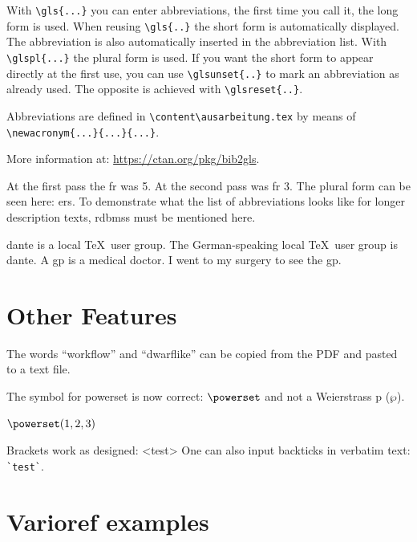 With \verb+\gls{...}+ you can enter abbreviations, the first time you call it, the long form is used.
When reusing \verb+\gls{..}+ the short form is automatically displayed.
The abbreviation is also automatically inserted in the abbreviation list.
With \verb+\glspl{...}+ the plural form is used.
If you want the short form to appear directly at the first use, you can use \verb+\glsunset{..}+ to mark an abbreviation as already used.
The opposite is achieved with \verb+\glsreset{..}+.

Abbreviations are defined in \verb+\content\ausarbeitung.tex+ by means of \verb+\newacronym{...}{...}{...}+.

More information at: \url{https://ctan.org/pkg/bib2gls}.

\begin{ltgexample}
At the first pass the \gls{fr} was 5.
At the second pass was \gls{fr} 3.
The plural form can be seen here: \glspl{er}.
To demonstrate what the list of abbreviations looks like for longer description texts, \glspl{rdbms} must be mentioned here.

\gls{dante} is a local \TeX\ user group.
The German-speaking local \TeX\ user group is \gls{dante}.
A \gls{gp} is a medical doctor.
I went to my surgery to see the \gls{gp}.
\end{ltgexample}


\section{Other Features}

\begin{ltgexample}
The words \enquote{workflow} and \enquote{dwarflike} can be copied from the PDF and pasted to a text file.
\end{ltgexample}

\begin{ltgexample}
The symbol for powerset is now correct: $\powerset$ and not a Weierstrass p ($\wp$).

$\powerset({1,2,3})$
\end{ltgexample}

\begin{ltgexample}
Brackets work as designed:
<test>
One can also input backticks in verbatim text: \verb|`test`|.
\end{ltgexample}


\section{Varioref examples}
\label{sec:ex:vref}

